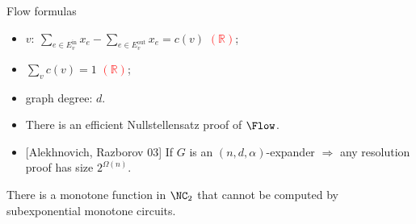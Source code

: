 \begin{frame}{Flow formulas}
    \begin{minipage}{0.5 \linewidth}
        
    \end{minipage}%
    \begin{minipage}{0.5 \linewidth}
        \pause
        \pause
        \begin{itemize}
            \item $v\colon ~ \sum\limits_{e \in E^{\mathrm{in}}_v} x_{e} -
                \sum\limits_{e \in E^{\mathrm{out}}_v} x_{e} = c(v)$ 
                \textcolor{red}{$(\mathbb{R})$};
            \item $\sum\limits_{v} c(v) = 1$ \textcolor{red}{$(\mathbb{R})$};
            \item graph degree: $d$.
        \end{itemize}
    \end{minipage}

    \pause
    \vspace{0.2cm}
    \begin{itemize}
        \item{} There is an efficient Nullstellensatz proof of $\Flow$.
        \item{} [Alekhnovich, Razborov 03] If $G$ is an $(n, d, \alpha)$-expander $\Rightarrow$ any
            resolution proof has size $2^{\Omega(n)}$.
    \end{itemize}

    \pause

    \begin{corollary}
        There is a monotone function in $\NC_2$ that cannot be computed by subexponential monotone
        circuits.
    \end{corollary}

\end{frame}